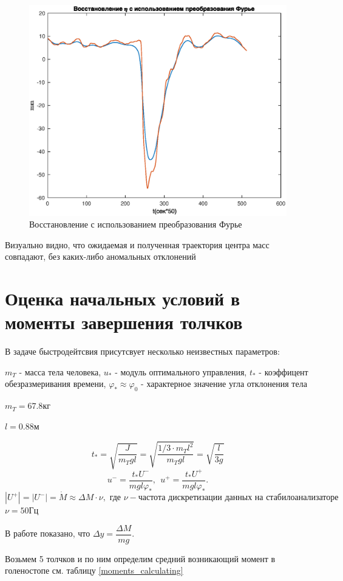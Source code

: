 \documentclass[a4paper,12pt, openany]{book}
\theoremstyle{plain} %
\theoremstyle{definition} %
\theoremstyle{remark} %
\numberwithin{equation}{chapter}
\begin{document}
{\begin{figure}[h!]
    \centering
    \includegraphics[width=0.65\linewidth]{restore_eta_fur_real.eps}
    \caption{Восстановление с использованием преобразования Фурье}
    \label{restore_fur_real}
\end{figure}

Визуально видно, что ожидаемая и полученная траектория центра масс совпадают,
без каких-либо аномальных отклонений

\section{Оценка начальных условий в моменты завершения толчков}

В задаче быстродейтсвия присутсвует несколько неизвестных параметров:

$m_T$ -  масса тела человека, $u_*$ - модуль оптимального управления,
$t_*$ - коэффицент обезразмеривания времени,
$\varphi_*\approx\varphi_0$ - характерное значение угла отклонения тела

$m_T=67.8$кг

$l=0.88$м

$$t_\ast=\sqrt{\frac{J}{m_Tgl}}=\sqrt{\frac{1/3 \cdot m_T l^2}{m_Tgl}}=\sqrt{\frac{l}{3g}}$$
\[
    u^-=\frac{t_\ast U^-}{mgl\varphi_\ast },\ \ u^+=\frac{t_\ast U^+}{mgl\varphi_\ast}.
\]
$|U^+|=|U^-|=\dot M\approx \Delta M \cdot \nu, \text{ где } \nu - \text{частота дискретизации данных на стабилоанализаторе } $
$\nu =50\text{Гц}$

В работе \cite{kruchinMetoda} показано, что $\Delta y=\dfrac{\Delta M}{mg}$.

Возьмем 5 толчков и по ним определим средний возникающий момент в голеностопе см. таблицу \ref*{moments_calculating}

}
\end{document}
